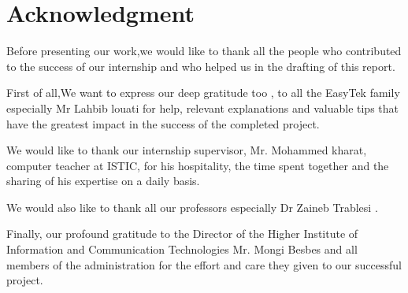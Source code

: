 

\chapter*{Acknowledgment}
Before presenting our work,we would like to thank all the people who contributed to the success of our internship and who helped us in the drafting of this report.

\vspace * {1cm}
First of all,We want to express our deep gratitude too ,  to all the EasyTek family especially Mr Lahbib louati for help, relevant explanations and valuable tips that have the greatest impact in the success of the completed project.

\vspace * {1cm}

We would like to thank our internship supervisor, Mr. Mohammed kharat, computer teacher at ISTIC, for his hospitality, the time spent together and the sharing of his expertise on a daily basis.

\vspace * {1cm}
We would also like to thank all our professors  especially Dr Zaineb Trablesi .

\vspace * {1cm}

Finally, our profound gratitude to the Director of the Higher Institute of Information and Communication Technologies Mr. Mongi Besbes  and all members of the administration for the effort and care they given to our successful project.


